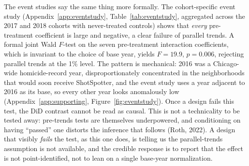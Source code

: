 \documentclass[12pt]{article}
\begin{document}
The event studies say the same thing more formally.
The cohort-specific event study (Appendix~\ref{app:eventstudy},
Table~\ref{tab:eventstudy}, aggregated across the
2017 and 2018 cohorts with never-treated controls) shows that \emph{every} pre-treatment
coefficient is large and negative, a clear failure of parallel trends. A formal joint
Wald $F$-test on the seven pre-treatment interaction coefficients, which is invariant to
the choice of base year, yields $F = 19.9$, $p = 0.006$, rejecting parallel trends at the
1\% level. The pattern is mechanical: 2016 was a Chicago-wide homicide-record year,
disproportionately concentrated in the neighborhoods that would soon receive ShotSpotter,
and the event study uses a year adjacent to 2016 as its base, so every other year looks
anomalously low (Appendix~\ref{app:supporting}, Figure~\ref{fig:eventstudy}). Once a design fails this test, the DiD
contrast cannot be read as causal. This is not a technicality to be tested away: pre-trends
tests are themselves underpowered, and conditioning on having ``passed'' one distorts the
inference that follows (Roth, 2022). A design that visibly \emph{fails} the test, as this
one does, is telling us the parallel-trends assumption is not available, and the credible
response is to report that the effect is not point-identified, not to lean on a single
base-year normalization.
\end{document}
